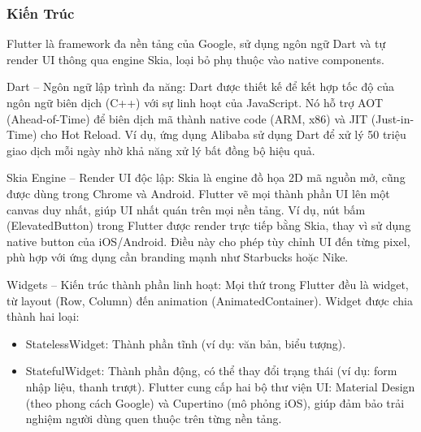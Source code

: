 \subsubsection{Kiến Trúc}
\begin{flushleft}
  \hspace*{0.8cm}
  \setlength{\leftmargini}{1.5cm}Flutter là framework đa nền tảng của Google, sử dụng ngôn ngữ Dart và tự render UI thông qua engine Skia, loại bỏ phụ thuộc vào native components.
\end{flushleft}

\begin{flushleft}
    \hspace*{0.8cm}Dart – Ngôn ngữ lập trình đa năng: Dart được thiết kế để kết hợp tốc độ của ngôn ngữ biên dịch (C++) với sự linh hoạt của JavaScript. Nó hỗ trợ AOT (Ahead-of-Time) để biên dịch mã thành native code (ARM, x86) và JIT (Just-in-Time) cho Hot Reload. Ví dụ, ứng dụng Alibaba sử dụng Dart để xử lý 50 triệu giao dịch mỗi ngày nhờ khả năng xử lý bất đồng bộ hiệu quả.
  \end{flushleft}

  \begin{flushleft}
    \hspace*{0.8cm}Skia Engine – Render UI độc lập: Skia là engine đồ họa 2D mã nguồn mở, cũng được dùng trong Chrome và Android. Flutter vẽ mọi thành phần UI lên một canvas duy nhất, giúp UI nhất quán trên mọi nền tảng. Ví dụ, nút bấm (ElevatedButton) trong Flutter được render trực tiếp bằng Skia, thay vì sử dụng native button của iOS/Android. Điều này cho phép tùy chỉnh UI đến từng pixel, phù hợp với ứng dụng cần branding mạnh như Starbucks hoặc Nike.
  \end{flushleft}

  \begin{flushleft}
    \hspace*{0.8cm}Widgets – Kiến trúc thành phần linh hoạt: Mọi thứ trong Flutter đều là widget, từ layout (Row, Column) đến animation (AnimatedContainer). Widget được chia thành hai loại:
    \setlength{\leftmargini}{1.5cm}
    \begin{itemize}
        \item StatelessWidget: Thành phần tĩnh (ví dụ: văn bản, biểu tượng).
        \item StatefulWidget: Thành phần động, có thể thay đổi trạng thái (ví dụ: form nhập liệu, thanh trượt).
        Flutter cung cấp hai bộ thư viện UI: Material Design (theo phong cách Google) và Cupertino (mô phỏng iOS), giúp đảm bảo trải nghiệm người dùng quen thuộc trên từng nền tảng.        
    \end{itemize}
  \end{flushleft}

